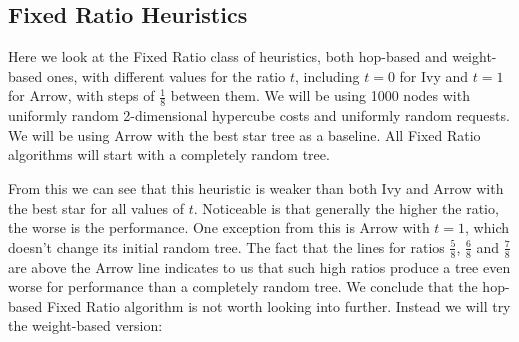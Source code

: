 \documentclass[a4paper, oneside]{discothesis}
\begin{document}
\subsection{Fixed Ratio Heuristics}

Here we look at the Fixed Ratio class of heuristics, both hop-based and weight-based ones, with different values for the ratio $t$, including $t=0$ for Ivy and $t=1$ for Arrow, with steps of $\frac{1}{8}$ between them. We will be using 1000 nodes with uniformly random 2-dimensional hypercube costs and uniformly random requests. We will be using Arrow with the best star tree as a baseline. All Fixed Ratio algorithms will start with a completely random tree.


From this we can see that this heuristic is weaker than both Ivy and Arrow with the best star for all values of $t$. Noticeable is that generally the higher the ratio, the worse is the performance. One exception from this is Arrow with $t=1$, which doesn't change its initial random tree. The fact that the lines for ratios $\frac{5}{8}$, $\frac{6}{8}$ and $\frac{7}{8}$ are above the Arrow line indicates to us that such high ratios produce a tree even worse for performance than a completely random tree. We conclude that the hop-based Fixed Ratio algorithm is not worth looking into further. Instead we will try the weight-based version:
\end{document}

